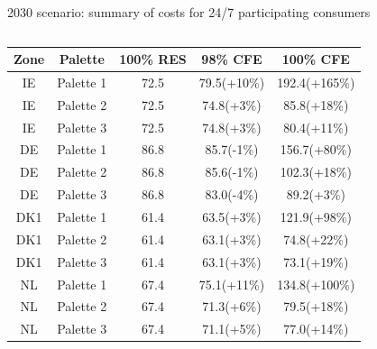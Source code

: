 \begin{frame}{2030 scenario: summary of costs for 24/7 participating consumers}
\begin{columns}[T]
\begin{column}{9cm}
    \centering
    {\footnotesize
    \begin{table}[h]
    \begin{tabular}{ccccc}
      \hline
      {\bf Zone} & {\bf Palette} &  {\bf 100\% RES} & {\bf 98\% CFE} & {\bf 100\% CFE} \\
      \hline
      \hline
      IE & Palette 1 & 72.5 & 79.5(+10\%) & 192.4(+165\%) \\ 
      \hline
      IE & Palette 2 & 72.5 & 74.8(+3\%) & 85.8(+18\%) \\
      \hline
      IE & Palette 3 & 72.5 & 74.8(+3\%) & 80.4(+11\%) \\
      \hline
      \hline
      DE & Palette 1 & 86.8 & 85.7(-1\%) & 156.7(+80\%) \\ 
      \hline
      DE & Palette 2 & 86.8 & 85.6(-1\%) & 102.3(+18\%) \\
      \hline
      DE & Palette 3 & 86.8 & 83.0(-4\%) & 89.2(+3\%) \\
      \hline
      \hline
      DK1 & Palette 1 & 61.4 & 63.5(+3\%) & 121.9(+98\%) \\ 
      \hline
      DK1  & Palette 2 & 61.4 & 63.1(+3\%) & 74.8(+22\%) \\
      \hline
      DK1  &  Palette 3 & 61.4 & 63.1(+3\%) & 73.1(+19\%) \\
      \hline
      \hline
      NL & Palette 1 & 67.4 & 75.1(+11\%) & 134.8(+100\%) \\ 
      \hline
      NL & Palette 2 & 67.4 & 71.3(+6\%)  & 79.5(+18\%) \\
      \hline
      NL &  Palette 3 & 67.4 & 71.1(+5\%) & 77.0(+14\%) \\
    \end{tabular}
    \end{table}
    }
    
  \end{column}
  \end{columns}
  \end{frame}





